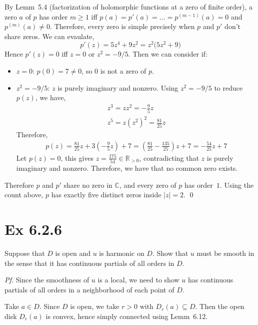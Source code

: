 \documentclass[a4paper]{article}
\begin{document}
\medskip
By Lemm~5.4 (factorization of holomorphic functions at a zero of finite order), a zero $a$ of $p$ has order $m\ge 1$ iff $p(a)=p'(a)=\dots=p^{(m-1)}(a)=0$ and $p^{(m)}(a)\ne 0$. Therefore, every zero is simple precisely when $p$ and $p'$ don't share zeros. We can evaulate,
\[
  p'(z)=5z^{4}+9z^{2}=z^{2}\bigl(5z^{2}+9\bigr)
\]
Hence $p'(z)=0$ iff $z=0$ or $z^{2}=-9/5$. Then we can consider if:
\begin{itemize}
  \item \underline{$z=0$}: $p(0)=7\ne 0$, so $0$ is not a zero of $p$.
  \item \underline{$z^{2}=-9/5$}: $z$ is purely imaginary and nonzero. Using $z^{2}=-9/5$ to reduce $p(z)$, we have,
  \begin{align*}
    z^{3}=zz^{2}=-\tfrac{9}{5}z \\ 
    z^{5}=z(z^{2})^{2}=\tfrac{81}{25}z
  \end{align*}
  Therefore,
  \begin{align*}
    p(z)=\tfrac{81}{25}z+3\!\left(-\tfrac{9}{5}z\right)+7=\left(\tfrac{81}{25}-\tfrac{135}{25}\right)z+7=-\tfrac{54}{25}z+7
  \end{align*}
  Let $p(z)=0$, this gives $z=\tfrac{175}{54}\in\mathbb{R}_{>0}$, contradicting that $z$ is purely imaginary and nonzero. Therefore, we have that no common zero exists.
\end{itemize}
Therefore $p$ and $p'$ share no zero in $\mathbb{C}$, and every zero of $p$ has order~$1$. Using the count above, $p$ has exactly five distinct zeros inside $|z|=2$. \qed

\newpage

\section*{Ex 6.2.6}

\begin{tcolorbox}[colback=gray!10, colframe=black, boxrule=0.5pt, arc=2mm]
Suppose that $D$ is open and $u$ is harmonic on $D$. Show that $u$ must be smooth in the sense that it has continuous partials of all orders in $D$.
\end{tcolorbox}

\textit{Pf.} Since the smoothness of $u$ is a local, we need to show $u$ has continuous partials of all orders in a neighborhood of each point of $D$.

\medskip
Take $a\in D$. Since $D$ is open, we take $r>0$ with $D_{r}(a)\subseteq D$. Then the open disk $D_{r}(a)$ is convex, hence simply connected using Lemm~6.12. 
\end{document}
